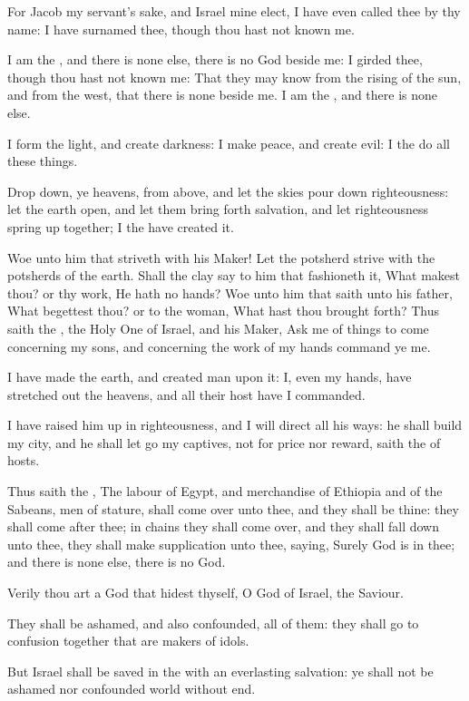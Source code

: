 \Verse For Jacob my servant's sake, and Israel mine elect, I have even called thee by thy name: I have surnamed thee, though thou hast not known me.

\Verse I am the \LORD, and there is none else, there is no God beside me: I girded thee, though thou hast not known me: \Verse That they may know from the rising of the sun, and from the west, that there is none beside me. I am the \LORD, and there is none else.

\Verse I form the light, and create darkness: I make peace, and create evil: I the \LORD do all these things.

\Verse Drop down, ye heavens, from above, and let the skies pour down righteousness: let the earth open, and let them bring forth salvation, and let righteousness spring up together; I the \LORD have created it.

\Verse Woe unto him that striveth with his Maker! Let the potsherd strive with the potsherds of the earth. Shall the clay say to him that fashioneth it, What makest thou? or thy work, He hath no hands?  \Verse Woe unto him that saith unto his father, What begettest thou? or to the woman, What hast thou brought forth?  \Verse Thus saith the \LORD, the Holy One of Israel, and his Maker, Ask me of things to come concerning my sons, and concerning the work of my hands command ye me.

\Verse I have made the earth, and created man upon it: I, even my hands, have stretched out the heavens, and all their host have I commanded.

\Verse I have raised him up in righteousness, and I will direct all his ways: he shall build my city, and he shall let go my captives, not for price nor reward, saith the \LORD of hosts.

\Verse Thus saith the \LORD, The labour of Egypt, and merchandise of Ethiopia and of the Sabeans, men of stature, shall come over unto thee, and they shall be thine: they shall come after thee; in chains they shall come over, and they shall fall down unto thee, they shall make supplication unto thee, saying, Surely God is in thee; and there is none else, there is no God.

\Verse Verily thou art a God that hidest thyself, O God of Israel, the Saviour.

\Verse They shall be ashamed, and also confounded, all of them: they shall go to confusion together that are makers of idols.

\Verse But Israel shall be saved in the \LORD with an everlasting salvation: ye shall not be ashamed nor confounded world without end.

